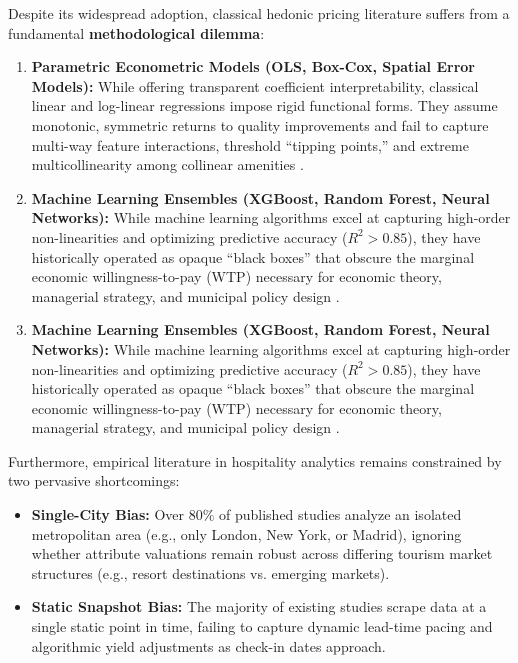 \documentclass[11pt,a4paper]{article}
\begin{document}
Despite its widespread adoption, classical hedonic pricing literature suffers from a fundamental \textbf{methodological dilemma}:
\begin{enumerate}[leftmargin=*]
    \item \textbf{Parametric Econometric Models (OLS, Box-Cox, Spatial Error Models):} While offering transparent coefficient interpretability, classical linear and log-linear regressions impose rigid functional forms. They assume monotonic, symmetric returns to quality improvements and fail to capture multi-way feature interactions, threshold ``tipping points,'' and extreme multicollinearity among collinear amenities \citep{wang2017}.
    \item \textbf{Machine Learning Ensembles (XGBoost, Random Forest, Neural Networks):} While machine learning algorithms excel at capturing high-order non-linearities and optimizing predictive accuracy ($R^2 > 0.85$), they have historically operated as opaque ``black boxes'' that obscure the marginal economic willingness-to-pay (WTP) necessary for economic theory, managerial strategy, and municipal policy design \citep{sanchez2020, giacalone2023}.
    \item \textbf{Machine Learning Ensembles (XGBoost, Random Forest, Neural Networks):} While machine learning algorithms excel at capturing high-order non-linearities and optimizing predictive accuracy ($R^2 > 0.85$), they have historically operated as opaque ``black boxes'' that obscure the marginal economic willingness-to-pay (WTP) necessary for economic theory, managerial strategy, and municipal policy design \citep{sanchez2019, wang2017}.
\end{enumerate}

Furthermore, empirical literature in hospitality analytics remains constrained by two pervasive shortcomings:
\begin{itemize}[leftmargin=*]
    \item \textbf{Single-City Bias:} Over $80\%$ of published studies analyze an isolated metropolitan area (e.g., only London, New York, or Madrid), ignoring whether attribute valuations remain robust across differing tourism market structures (e.g., resort destinations vs. emerging markets).
    \item \textbf{Static Snapshot Bias:} The majority of existing studies scrape data at a single static point in time, failing to capture dynamic lead-time pacing and algorithmic yield adjustments as check-in dates approach.
\end{itemize}
\end{document}
